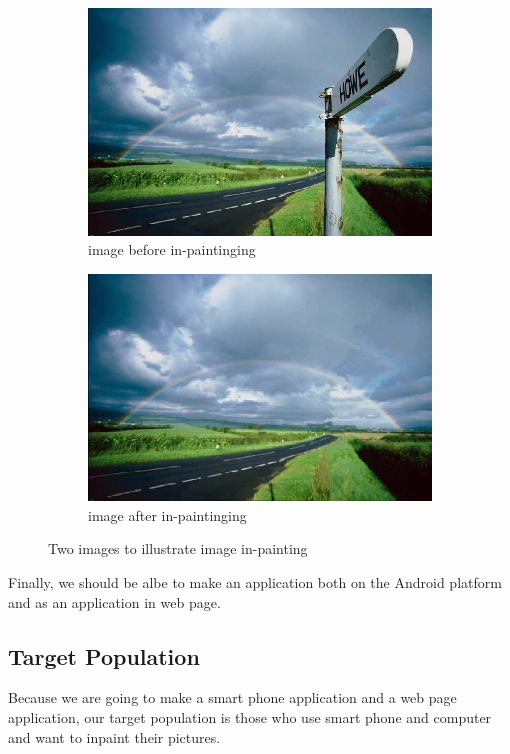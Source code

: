 \documentclass[12pt]{article}
\begin{document}
\begin{figure}[H]
	\begin{subfigure}[pos]{.5\textwidth}
		\centering
		\includegraphics*[width=0.8\linewidth]{1.jpg}
		\caption{image before in-paintinging}
	\end{subfigure}%
	\begin{subfigure}[pos]{.5\textwidth}
		\centering
		\includegraphics*[width=0.8\linewidth]{2.jpg}
		\caption{image after in-paintinging}
	\end{subfigure}%
	\caption{Two images to illustrate image in-painting}
\end{figure}
 
\qquad Finally, we should be albe to make an application both on the Android platform and as an application in web page.
\subsection{Target Population}
\qquad Because we are going to make a smart phone application and a web page application, our target population is those who use smart phone and computer and want to inpaint their pictures.
\end{document}
